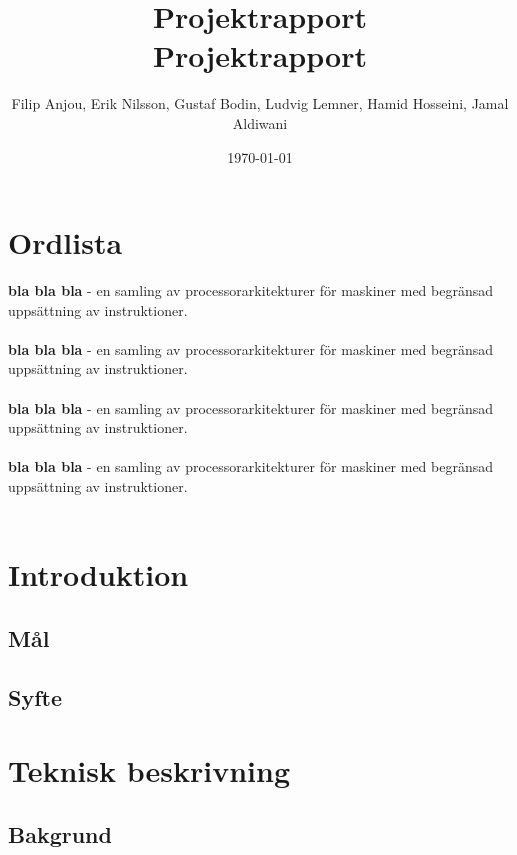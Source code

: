 \documentclass[a4paper, 10pt]{article}
\title{%
  \textbf{Projektrapport} \\
  \large Projektrapport}
\author{ Filip Anjou, Erik Nilsson, Gustaf Bodin, Ludvig Lemner, Hamid Hosseini, Jamal Aldiwani}
\date{\today}
\begin{document}
\maketitle
\thispagestyle{empty}
\newpage

\tableofcontents
\thispagestyle{empty}
\newpage


\label{ch:ordlista}
\section*{Ordlista}

\textbf {bla bla bla} - en samling av processorarkitekturer för maskiner med begränsad uppsättning av instruktioner.
\\
\\
\textbf {bla bla bla} - en samling av processorarkitekturer för maskiner med begränsad uppsättning av instruktioner.
\\
\\
\textbf {bla bla bla} - en samling av processorarkitekturer för maskiner med begränsad uppsättning av instruktioner.
\\
\\
\textbf {bla bla bla} - en samling av processorarkitekturer för maskiner med begränsad uppsättning av instruktioner.
\\
\\



\label{ch:introduktion}
\section{Introduktion}

\subsection{Mål}

\subsection{Syfte}



\label{ch:tekniskbeskrivning}
\section{Teknisk beskrivning}
\subsection{Bakgrund}
\end{document}
